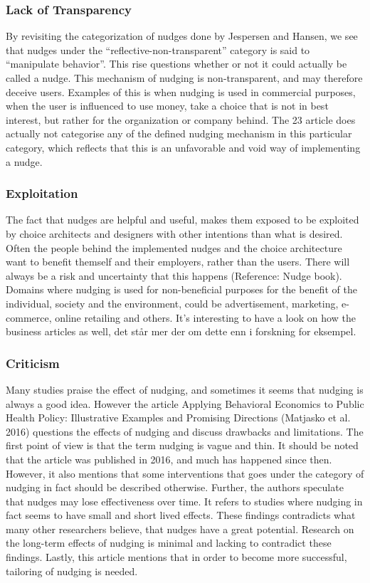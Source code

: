 {\subsubsection{Lack of Transparency}
By revisiting the categorization of nudges done by Jespersen and Hansen, we see that nudges under the “reflective-non-transparent” category is said to “manipulate behavior”. This rise questions whether or not it could actually be called a nudge. This mechanism of nudging is non-transparent, and may therefore deceive users. Examples of this is when nudging is used in commercial purposes, when the user is influenced to use money, take a choice that is not in best interest, but rather for the organization or company behind. The 23 article does actually not categorise any of the defined nudging mechanism in this particular category, which reflects that this is an unfavorable and void way of implementing a nudge. 

\subsubsection{Exploitation}
The fact that nudges are helpful and useful, makes them exposed to be exploited by choice architects and designers with other intentions than what is desired. Often the people behind the implemented nudges and the choice architecture want to benefit themself and their employers, rather than the users. There will always be a risk and uncertainty that this happens (Reference: Nudge book). Domains where nudging is used for non-beneficial purposes for the benefit of the individual, society and the environment, could be advertisement, marketing, e-commerce, online retailing and others. It’s interesting to have a look on how the business articles as well, det står mer der om dette enn i forskning for eksempel. 

\subsubsection{Criticism}
Many studies praise the effect of nudging, and sometimes it seems that nudging is always a good idea. However the article Applying Behavioral Economics to Public Health Policy: Illustrative Examples and Promising Directions (Matjasko et al. 2016) questions the effects of nudging and discuss drawbacks and limitations. The first point of view is that the term nudging is vague and thin. It should be noted that the article was published in 2016, and much has happened since then. However, it also mentions that some interventions that goes under the category of nudging in fact should be described otherwise. Further, the authors speculate that nudges may lose effectiveness over time. It refers to studies where nudging in fact seems to have small and short lived effects. These findings contradicts what many other researchers believe, that nudges have a great potential. Research on the long-term effects of nudging is minimal and lacking to contradict these findings. Lastly, this article mentions that in order to become more successful, tailoring of nudging is needed. 

}
